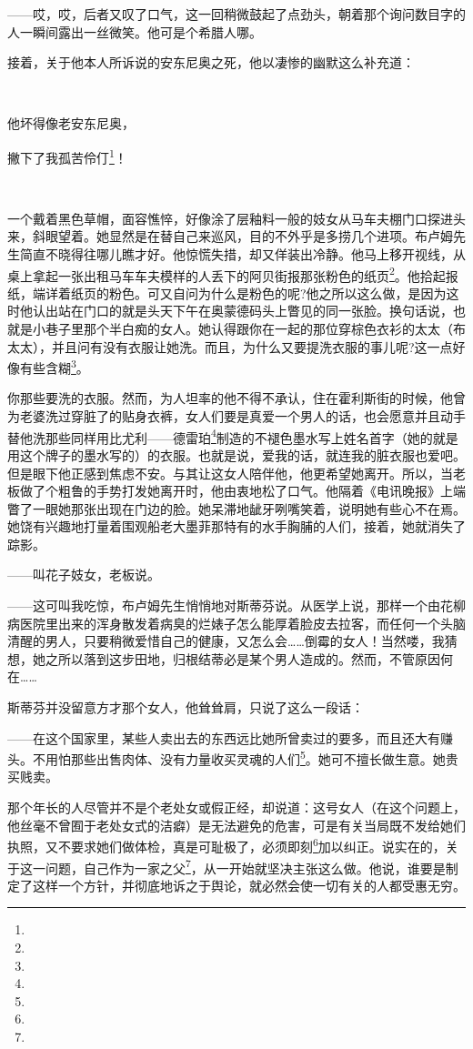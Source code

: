 \par ——哎，哎，后者又叹了口气，这一回稍微鼓起了点劲头，朝着那个询问数目字的人一瞬间露出一丝微笑。他可是个希腊人哪。
\par 接着，关于他本人所诉说的安东尼奥之死，他以凄惨的幽默这么补充道：
\par  
\par 他坏得像老安东尼奥，
\par 撇下了我孤苦伶仃\footnote{}！
\par  
\par 一个戴着黑色草帽，面容憔悴，好像涂了层釉料一般的妓女从马车夫棚门口探进头来，斜眼望着。她显然是在替自己来巡风，目的不外乎是多捞几个进项。布卢姆先生简直不晓得往哪儿瞧才好。他惊慌失措，却又佯装出冷静。他马上移开视线，从桌上拿起一张出租马车车夫模样的人丢下的阿贝街报那张粉色的纸页\footnote{}。他拾起报纸，端详着纸页的粉色。可又自问为什么是粉色的呢?他之所以这么做，是因为这时他认出站在门口的就是头天下午在奥蒙德码头上瞥见的同一张脸。换句话说，也就是小巷子里那个半白痴的女人。她认得跟你在一起的那位穿棕色衣衫的太太（布太太），并且问有没有衣服让她洗。而且，为什么又要提洗衣服的事儿呢?这一点好像有些含糊\footnote{}。
\par 你那些要洗的衣服。然而，为人坦率的他不得不承认，住在霍利斯街的时候，他曾为老婆洗过穿脏了的贴身衣裤，女人们要是真爱一个男人的话，也会愿意并且动手替他洗那些同样用比尤利——德雷珀\footnote{}制造的不褪色墨水写上姓名首字（她的就是用这个牌子的墨水写的）的衣服。也就是说，爱我的话，就连我的脏衣服也爱吧。但是眼下他正感到焦虑不安。与其让这女人陪伴他，他更希望她离开。所以，当老板做了个粗鲁的手势打发她离开时，他由衷地松了口气。他隔着《电讯晚报》上端瞥了一眼她那张出现在门边的脸。她呆滞地龇牙咧嘴笑着，说明她有些心不在焉。她饶有兴趣地打量着围观船老大墨菲那特有的水手胸脯的人们，接着，她就消失了踪影。
\par ——叫花子妓女，老板说。
\par ——这可叫我吃惊，布卢姆先生悄悄地对斯蒂芬说。从医学上说，那样一个由花柳病医院里出来的浑身散发着病臭的烂婊子怎么能厚着脸皮去拉客，而任何一个头脑清醒的男人，只要稍微爱惜自己的健康，又怎么会……倒霉的女人！当然喽，我猜想，她之所以落到这步田地，归根结蒂必是某个男人造成的。然而，不管原因何在……
\par 斯蒂芬并没留意方才那个女人，他耸耸肩，只说了这么一段话：
\par ——在这个国家里，某些人卖出去的东西远比她所曾卖过的要多，而且还大有赚头。不用怕那些出售肉体、没有力量收买灵魂的人们\footnote{}。她可不擅长做生意。她贵买贱卖。
\par 那个年长的人尽管并不是个老处女或假正经，却说道：这号女人（在这个问题上，他丝毫不曾囿于老处女式的洁癖）是无法避免的危害，可是有关当局既不发给她们执照，又不要求她们做体检，真是可耻极了，必须即刻\footnote{}加以纠正。说实在的，关于这一问题，自己作为一家之父\footnote{}，从一开始就坚决主张这么做。他说，谁要是制定了这样一个方针，并彻底地诉之于舆论，就必然会使一切有关的人都受惠无穷。
